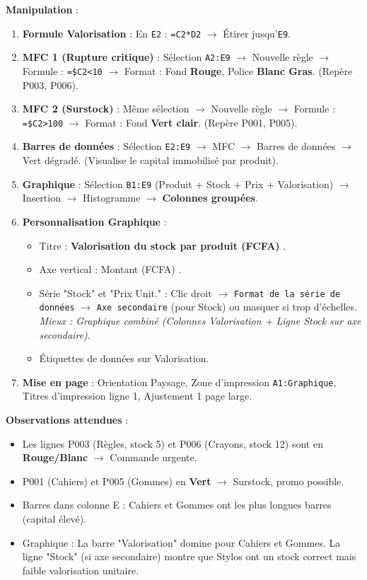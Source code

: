\documentclass[11pt]{article}
\begin{document}
\begin{experience}
\textbf{Manipulation} :
\begin{enumerate}
    \item \textbf{Formule Valorisation} : En \texttt{E2} : \texttt{=C2*D2} $\to$ Étirer jusqu'\texttt{E9}.
    \item \textbf{MFC 1 (Rupture critique)} : Sélection \texttt{A2:E9} $\to$ Nouvelle règle $\to$ Formule : \texttt{=\$C2<10} $\to$ Format : Fond \textbf{Rouge}, Police \textbf{Blanc Gras}. (Repère P003, P006).
    \item \textbf{MFC 2 (Surstock)} : Même sélection $\to$ Nouvelle règle $\to$ Formule : \texttt{=\$C2>100} $\to$ Format : Fond \textbf{Vert clair}. (Repère P001, P005).
    \item \textbf{Barres de données} : Sélection \texttt{E2:E9} $\to$ MFC $\to$ Barres de données $\to$ Vert dégradé. (Visualise le capital immobilisé par produit).
    \item \textbf{Graphique} : Sélection \texttt{B1:E9} (Produit + Stock + Prix + Valorisation) $\to$ Insertion $\to$ Histogramme $\to$ \textbf{Colonnes groupées}.
    \item \textbf{Personnalisation Graphique} :
    \begin{itemize}
        \item Titre : \og \textbf{Valorisation du stock par produit (FCFA)} \fg.
        \item Axe vertical : \og Montant (FCFA) \fg.
        \item Série "Stock" et "Prix Unit." : Clic droit $\to$ \texttt{Format de la série de données} $\to$ \texttt{Axe secondaire} (pour Stock) ou masquer si trop d'échelles. \textit{Mieux : Graphique combiné (Colonnes Valorisation + Ligne Stock sur axe secondaire)}.
        \item Étiquettes de données sur Valorisation.
    \end{itemize}
    \item \textbf{Mise en page} : Orientation Paysage, Zone d'impression \texttt{A1:Graphique}, Titres d'impression ligne 1, Ajustement 1 page large.
\end{enumerate}

\textbf{Observations attendues} :
\begin{itemize}
    \item Les lignes P003 (Règles, stock 5) et P006 (Crayons, stock 12) sont en \textbf{Rouge/Blanc} $\to$ Commande urgente.
    \item P001 (Cahiers) et P005 (Gommes) en \textbf{Vert} $\to$ Surstock, promo possible.
    \item Barres dans colonne E : Cahiers et Gommes ont les plus longues barres (capital élevé).
    \item Graphique : La barre "Valorisation" domine pour Cahiers et Gommes. La ligne "Stock" (si axe secondaire) montre que Stylos ont un stock correct mais faible valorisation unitaire.
\end{itemize}


\end{experience}
\end{document}
